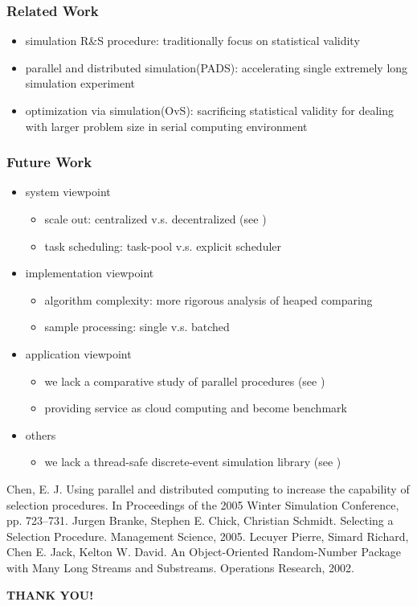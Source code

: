 \documentclass{beamer}
\begin{document}
\begin{frame}
\frametitle{Related Work}
\begin{itemize}
\item simulation R\&S procedure: traditionally focus on statistical validity
\vspace{\baselineskip}
\item parallel and distributed simulation(PADS): accelerating single extremely long simulation experiment
\vspace{\baselineskip}
\item optimization via simulation(OvS): sacrificing statistical validity for dealing with larger problem size in serial computing environment
\end{itemize}
\end{frame}

\begin{frame}
\frametitle{Future Work}
\begin{itemize}
\item system viewpoint
\begin{itemize}
\item scale out: centralized v.s. decentralized (see \cite{potwsc05ras})
\item task scheduling: task-pool v.s. explicit scheduler
\end{itemize}
\item implementation viewpoint
\begin{itemize}
\item algorithm complexity: more rigorous analysis of heaped comparing
\item sample processing: single v.s. batched
\end{itemize}
\item application viewpoint
\begin{itemize}
\item we lack a comparative study of parallel procedures (see \cite{ms05ras})
\item providing service as cloud computing and become benchmark
\end{itemize}
\item others
\begin{itemize}
\item we lack a thread-safe discrete-event simulation library (see \cite{ssj})
\end{itemize}
\end{itemize}
\tiny
{
\begin{thebibliography}{10}
 Chen, E. J. Using parallel and distributed computing to increase the capability of selection procedures. In Proceedings of the 2005 Winter Simulation Conference, pp. 723–731.
 Jurgen Branke, Stephen E. Chick, Christian Schmidt. Selecting a Selection Procedure. Management Science, 2005.
 Lecuyer Pierre, Simard Richard, Chen E. Jack, Kelton W. David. An Object-Oriented Random-Number Package with Many Long Streams and Substreams. Operations Research, 2002.
\end{thebibliography}
}
\end{frame}

\begin{frame}
\begin{center}
\Huge \bf \color{blue} THANK YOU!
\end{center}
\end{frame}
\end{document}
